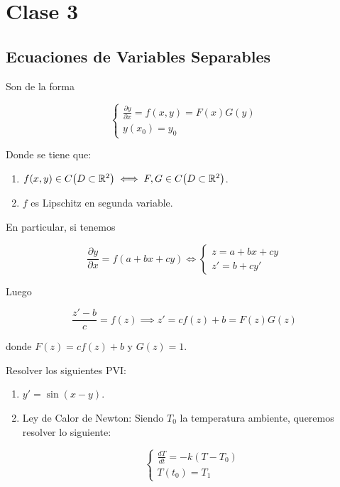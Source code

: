 \section{Clase 3}
\subsection{Ecuaciones de Variables Separables}

Son de la forma

\[
    \begin{cases*}
        \frac{\partial y}{\partial x} = f(x, y) = F(x)G(y) \\
        y(x_0) = y_0
    \end{cases*}
\]

Donde se tiene que:

\begin{enumerate}
    \item $f(x, y) \in C\big( D \subset \mathbb{R}^2 \big) \iff F, G \in C\big( D \subset \mathbb{R}^2 \big)$.
    \item $f$ es Lipschitz en segunda variable.
\end{enumerate}

En particular, si tenemos

\[
    \frac{\partial y}{\partial x} = f(a + bx + cy) \iff \begin{cases*}
                                            z = a + bx + cy \\
                                            z' = b + cy'
                                        \end{cases*}
\]

Luego

\[
    \frac{z' - b}{c} = f(z) \implies z' = cf(z) + b = F(z)G(z)
\]

donde $F(z) = cf(z) + b$ y $G(z) = 1$.


\begin{ejem}
    Resolver los siguientes PVI:

    \begin{enumerate}
        \item $y' = \sin(x-y)$.
        \item Ley de Calor de Newton: Siendo $T_0$ la temperatura ambiente, queremos resolver lo siguiente:
        
        \[
            \begin{cases*}
                \frac{dT}{dt} = -k(T - T_0) \\
                T(t_0) = T_1
            \end{cases*}  
        \]
    \end{enumerate}
\end{ejem}

